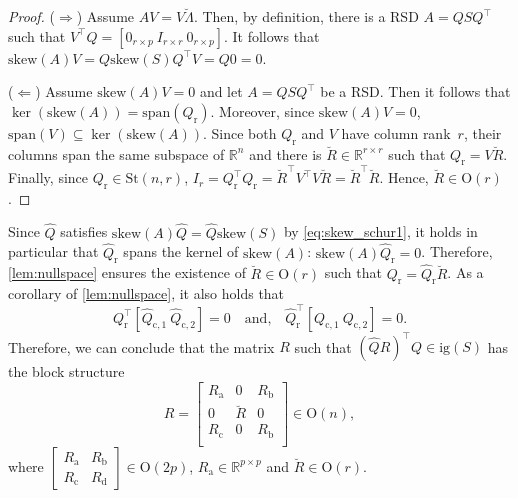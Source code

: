 \documentclass[10pt,twoside,dvipsnames]{siamart1116}
\numberwithin{algorithm}{section}
\numberwithin{equation}{section}
\begin{document}
	\begin{proof}
	($\Longrightarrow$) Assume $AV = V\breve{\Lambda}$. Then, by definition, there is a RSD $A = QSQ^\top $ such that $V^\top  Q = [0_{r \times p} \ I_{r\times r}\ 0_{r\times p}]$. It follows that $\mathrm{skew}(A)V = Q\mathrm{skew}(S)Q^\top V = Q0=0$. 
	
	($\Longleftarrow$) Assume $\mathrm{skew}(A)V = 0$ and let $A=QSQ^\top $ be a RSD. Then it follows that $\ker(\mathrm{skew}(A)) = \mathrm{span}(Q_\mathrm{r})$. Moreover, since $\mathrm{skew}(A)V = 0$, $\mathrm{span}(V)\subseteq \ker(\mathrm{skew}(A))$.
Since both $Q_{\mathrm{r}}$ and $V$ have column rank~$r$, their columns span the same subspace of $\mathbb{R}^n$ and there is $\breve{R} \in \mathbb{R}^{r\times r}$ such that $Q_{\mathrm{r}}=V\breve{R}$. Finally, since $Q_{\mathrm{r}}\in\mathrm{St}(n,r)$, $I_r=Q_{\mathrm{r}}^\top Q_{\mathrm{r}}=\breve{R}^\top V^\top V\breve{R}=\breve{R}^\top \breve{R}$. Hence, $\breve{R}\in\mathrm{O}(r)$. 
	\end{proof}
	
	
 Since $\widehat{Q}$ satisfies $\mathrm{skew}(A)\widehat{Q}=\widehat{Q}\mathrm{skew}(S)$ by \eqref{eq:skew_schur1}, it holds in particular that $\widehat{Q}_\mathrm{r}$ spans the kernel of $\mathrm{skew}(A)$: $\mathrm{skew}(A)\widehat{Q}_\mathrm{r}=0$. Therefore, \cref{lem:nullspace} ensures the existence of $\breve{R}\in\mathrm{O}(r)$ such that $Q_\mathrm{r} = \widehat{Q}_\mathrm{r}\breve{R}$. As a corollary of \cref{lem:nullspace}, it also holds that
\begin{equation*}
Q_\mathrm{r}^\top [\widehat{Q}_{\mathrm{c},1} \ \widehat{Q}_{\mathrm{c},2} ] =0\quad \text{and,}\quad \widehat{Q}_\mathrm{r}^\top [Q_{\mathrm{c},1} \ Q_{\mathrm{c},2} ]=0.
\end{equation*}
Therefore, we can conclude that the matrix $R$ such that $(\widehat{Q}R)^\top Q \in \mathrm{ig}(S)$ has the block structure
\begin{equation}\label{eq:structure_M}
		R=\begin{bmatrix}
		R_{\mathrm{a}}&0&R_{\mathrm{b}}\\
		0&\breve{R}&0\\
		R_{\mathrm{c}}&0&R_{\mathrm{b}}\\
		\end{bmatrix}\in\mathrm{O}(n),
		\end{equation}
		 where $\left[\begin{smallmatrix}R_{\mathrm{a}}&R_{\mathrm{b}}\\R_{\mathrm{c}}&R_{\mathrm{d}}\end{smallmatrix}\right]\in\mathrm{O}(2p)$, $R_\mathrm{a}\in\mathbb{R}^{p\times p}$ and $\breve{R}\in\mathrm{O}(r)$. 
		 
\end{document}
